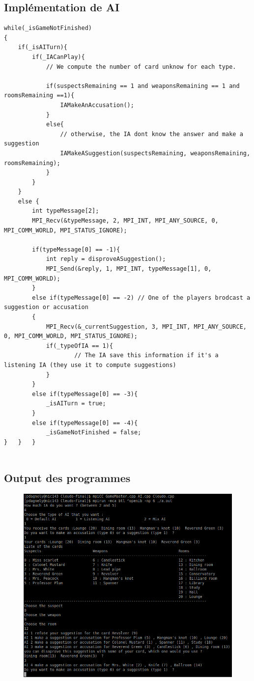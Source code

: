 \documentclass[a4paper,10pt]{article}
\begin{document}
	 
	 \subsection{Implémentation de AI} 	\hypertarget{AIimplementation}{}
	 
\begin{lstlisting}
while(_isGameNotFinished)
{
	if(_isAITurn){
		if(_IACanPlay){
			// We compute the number of card unknow for each type.
			
			if(suspectsRemaining == 1 and weaponsRemaining == 1 and roomsRemaining ==1){
				IAMakeAnAccusation();
			}
			else{
				// otherwise, the IA dont know the answer and make a suggestion
				IAMakeASuggestion(suspectsRemaining, weaponsRemaining, roomsRemaining);
			}
		}
	}
	else {
		int typeMessage[2];
		MPI_Recv(&typeMessage, 2, MPI_INT, MPI_ANY_SOURCE, 0, MPI_COMM_WORLD, MPI_STATUS_IGNORE);
			
		if(typeMessage[0] == -1){
			int reply = disproveASuggestion();
			MPI_Send(&reply, 1, MPI_INT, typeMessage[1], 0, MPI_COMM_WORLD);
		}
		else if(typeMessage[0] == -2) // One of the players brodcast a suggestion or accusation
		{	
			MPI_Recv(&_currentSuggestion, 3, MPI_INT, MPI_ANY_SOURCE, 0, MPI_COMM_WORLD, MPI_STATUS_IGNORE);
			if(_typeOfIA == 1){
					// The IA save this information if it's a listening IA (they use it to compute suggestions)
			}
		}
		else if(typeMessage[0] == -3){
			_isAITurn = true;
		}
		else if(typeMessage[0] == -4){
			_isGameNotFinished = false;	
}	}	}


\end{lstlisting}
\fontfamily{}
	  

	 \subsection{Output des programmes}
		\begin{figure}[H] \hspace*{-2cm} 
    	\centering
   		  \includegraphics[width=350pt]{output.png} 
	  	\end{figure}
\end{document}
